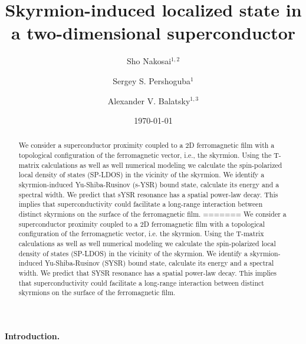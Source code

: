 \documentclass[twocolumn,showpacs,floatfix,nofootinbib,longbibliography]{revtex4-1}
\begin{document}
\title{Skyrmion-induced localized state in a two-dimensional superconductor}

\author{Sho Nakosai$^{1,2}$}
\author{Sergey S. Pershoguba$^{1}$}
\author{Alexander V. Balatsky$^{1,3}$}

\date{\today}


\begin{abstract}
We consider a superconductor proximity coupled to a 2D ferromagnetic film with a topological configuration of the ferromagnetic vector, i.e., the skyrmion. Using the T-matrix calculations as well as well numerical modeling we calculate the spin-polarized local density of states (SP-LDOS) in the vicinity of the skyrmion. We identify a skyrmion-induced Yu-Shiba-Rusinov (s-YSR) bound state, calculate its energy and a spectral width. We predict that sYSR resonance has a spatial power-law decay. This implies that superconductivity could facilitate a long-range interaction between distinct skyrmions on the surface of the ferromagnetic film.
=======
We consider a superconductor proximity coupled to a 2D ferromagnetic film with a topological configuration of the ferromagnetic vector, i.e. the skyrmion. Using the T-matrix calculations as well as well numerical modeling we calculate the spin-polarized local density of states (SP-LDOS) in the vicinity of the skyrmion. We identify a skyrmion-induced Yu-Shiba-Rusinov (SYSR) bound state, calculate its energy and a spectral width. We predict that SYSR resonance has a spatial power-law decay. This implies that superconductivity could facilitate a long-range interaction between distinct skyrmions on the surface of the ferromagnetic film.
\end{abstract}

\pacs{}


\maketitle
\paragraph*{Introduction.} \label{sec:intro}
\end{document}
